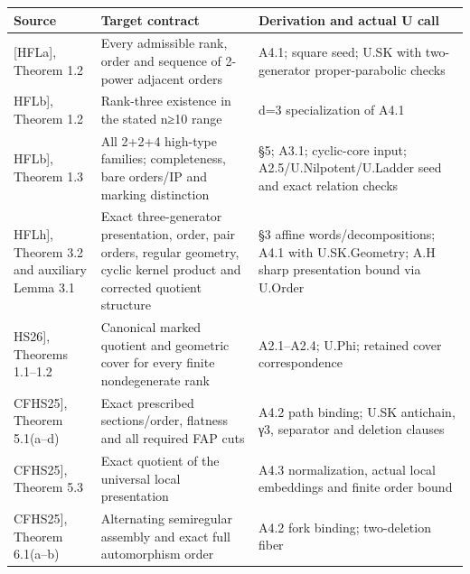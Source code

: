 \documentclass[
  11pt,
  a4paper,
]{article}
\newcounter{none} %
\begin{document}
{\def\LTcaptype{none} %
\begin{longtable}[]{@{}
  >{\raggedright\arraybackslash}p{}
  >{\raggedright\arraybackslash}p{}
  >{\raggedright\arraybackslash}p{}@{}}
\toprule\noalign{}
\begin{minipage}[b]{\linewidth}\raggedright
Source
\end{minipage} & \begin{minipage}[b]{\linewidth}\raggedright
Target contract
\end{minipage} & \begin{minipage}[b]{\linewidth}\raggedright
Derivation and actual U call
\end{minipage} \\
\midrule\noalign{}
\endhead
\bottomrule\noalign{}
\endlastfoot
{[}HFLa{]}, Theorem 1.2 & Every admissible rank, order and sequence of
2-power adjacent orders & A4.1; square seed; U.SK with two-generator
proper-parabolic checks \\
{[}HFLb{]}, Theorem 1.2 & Rank-three existence in the stated n≥10 range
& d=3 specialization of A4.1 \\
{[}HFLb{]}, Theorem 1.3 & All 2+2+4 high-type families; completeness,
bare orders/IP and marking distinction & §5; A3.1; cyclic-core input;
A2.5/U.Nilpotent/U.Ladder seed and exact relation checks \\
{[}HFLh{]}, Theorem 3.2 and auxiliary Lemma 3.1 & Exact three-generator
presentation, order, pair orders, regular geometry, cyclic kernel
product and corrected quotient structure & §3 affine
words/decompositions; A4.1 with U.SK.Geometry; A.H sharp presentation
bound via U.Order \\
{[}HS26{]}, Theorems 1.1--1.2 & Canonical marked quotient and geometric
cover for every finite nondegenerate rank & A2.1--A2.4; U.Phi; retained
cover correspondence \\
{[}CFHS25{]}, Theorem 5.1(a--d) & Exact prescribed sections/order,
flatness and all required FAP cuts & A4.2 path binding; U.SK antichain,
γ3, separator and deletion clauses \\
{[}CFHS25{]}, Theorem 5.3 & Exact quotient of the universal local
presentation & A4.3 normalization, actual local embeddings and finite
order bound \\
{[}CFHS25{]}, Theorem 6.1(a--b) & Alternating semiregular assembly and
exact full automorphism order & A4.2 fork binding; two-deletion fiber

\end{longtable}}
\end{document}
